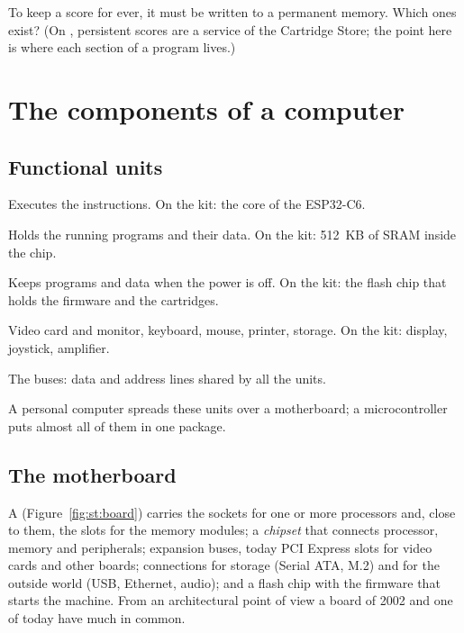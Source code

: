 To keep a score for ever, it must be written to a permanent memory. Which
ones exist? (On \prg, persistent scores are a service of the Cartridge Store;
the point here is where each section of a program lives.)

\section{The components of a computer}

\subsection{Functional units}

\begin{description}[style=nextline,leftmargin=1.5em]
\item[Processor.] Executes the instructions. On the kit: the \riscv core of
  the ESP32-C6.
\item[Main memory.] Holds the running programs and their data. On the kit:
  512~KB of SRAM inside the chip.
\item[Secondary memory.] Keeps programs and data when the power is off. On
  the kit: the flash chip that holds the firmware and the cartridges.
\item[Input/output devices.] Video card and monitor, keyboard, mouse, printer,
  storage. On the kit: display, joystick, amplifier.
\item[Communication lines.] The buses: data and address lines shared by all
  the units.
\end{description}

A personal computer spreads these units over a motherboard; a microcontroller
puts almost all of them in one package.

\subsection{The motherboard}

A  (Figure~\ref{fig:st:board}) carries the sockets for one
or more processors and, close to them, the slots for the memory modules; a
\emph{chipset} that connects processor, memory and peripherals; expansion
buses, today PCI Express slots for video cards and other boards; connections
for storage (Serial ATA, M.2) and for the outside world (USB, Ethernet,
audio); and a flash chip with the firmware that starts the machine. From an
architectural point of view a board of 2002 and one of today have much in
common.

